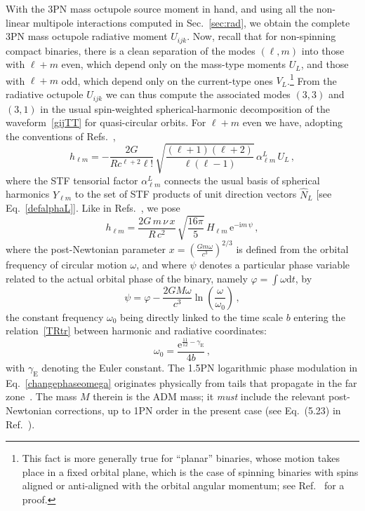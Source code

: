 \documentclass[prd,preprint,superscriptaddress,tightenlines,nofootinbib,
  eqsecnum,showpacs]{revtex4}
\newcommand{\ud}{\mathrm{d}}
\newcommand{\ui}{\mathrm{i}}
\begin{document}
With the 3PN mass octupole source moment in hand, and using all the
non-linear multipole interactions computed in Sec.~\ref{sec:rad}, we
obtain the complete 3PN mass octupole radiative moment $U_{ijk}$. Now,
recall that for non-spinning compact binaries, there is a clean
separation of the modes $(\ell,m)$ into those with $\ell+m$ even,
which depend only on the mass-type moments $U_L$, and those with
$\ell+m$ odd, which depend only on the current-type ones
$V_L$.\footnote{This fact is more generally true for ``planar''
  binaries, whose motion takes place in a fixed orbital plane, which
  is the case of spinning binaries with spins aligned or anti-aligned
  with the orbital angular momentum; see Ref.~\cite{FMBI12} for a
  proof.} From the radiative octupole $U_{ijk}$ we can thus compute
the associated modes $(3,3)$ and $(3,1)$ in the usual spin-weighted
spherical-harmonic decomposition of the waveform~\eqref{gijTT} for
quasi-circular orbits. For $\ell+m$ even we have, adopting the
conventions of Refs.~\cite{BFIS08, FMBI12},
%
\begin{equation}\label{modes}
h_{\ell m} = - \frac{2G}{R c^{\ell +2}\ell!}
\,\sqrt{\frac{(\ell+1)(\ell+2)}{\ell(\ell-1)}} \,\alpha^L_{\ell
  m}\,U_L\,,
\end{equation}
%
where the STF tensorial factor $\alpha^L_{\ell m}$ connects the usual
basis of spherical harmonics $Y_{\ell m}$ to the set of STF products
of unit direction vectors $\hat{N}_L$ [see
  Eq.~\eqref{defalphaL}]. Like in Refs.~\cite{BFIS08, FMBI12}, we pose
%
\begin{equation}\label{modedef}
  h_{\ell m} = \frac{2 G \,m \,\nu \,x}{R \,c^2}
  \,\sqrt{\frac{16\pi}{5}}\, H_{\ell m}\,\mathrm{e}^{-\ui m \, \psi} \,,
\end{equation}
%
where the post-Newtonian parameter $x=(\frac{G m\omega}{c^3})^{2/3}$
is defined from the orbital frequency of circular motion $\omega$, and
where $\psi$ denotes a particular phase variable related to the actual
orbital phase of the binary, namely $\varphi=\int\omega\ud t$, by
%
\begin{equation}\label{changephaseomega}
\psi = \varphi - \frac{2 G M \omega}{c^3}
\ln\left(\frac{\omega}{\omega_0}\right) \,,
\end{equation}
%
the constant frequency $\omega_0$ being directly linked to the time
scale $b$ entering the relation~\eqref{TRtr} between harmonic and
radiative coordinates:
%
\begin{equation}\label{omega0}
\omega_0=\frac{\mathrm{e}^{\frac{11}{12}-\gamma_\text{E}}}{4b}\,,
\end{equation}
%
with $\gamma_\text{E}$ denoting the Euler constant. The 1.5PN
logarithmic phase modulation in Eq.~\eqref{changephaseomega}
originates physically from tails that propagate in the far
zone~\cite{BIWW96, ABIQ04}. The mass $M$ therein is the ADM mass; it
\textit{must} include the relevant post-Newtonian corrections, up to
1PN order in the present case (see Eq.~(5.23) in Ref.~\cite{BFIS08}).
\end{document}
